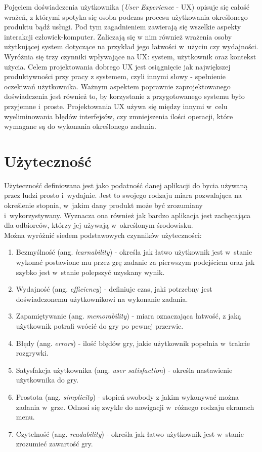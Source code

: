 \documentclass[a4paper,12pt,numbers=noenddot]{report}
\begin{document}
Pojęciem doświadczenia użytkownika (\textit{User Experience} - UX) opisuje się całość wrażeń, z którymi spotyka się osoba podczas procesu użytkowania określonego produktu bądź usługi. Pod tym zagadnieniem zawierają się wszelkie aspekty interakcji człowiek-komputer. Zaliczają się w nim również wrażenia osoby użytkującej system dotyczące na przykład jego łatwości w~użyciu czy wydajności. Wyróżnia się trzy czynniki wpływające na UX: system, użytkownik oraz kontekst użycia. \cite{online_UXDef}
Celem projektowania dobrego UX jest osiągnięcie jak największej produktywności przy pracy z systemem, czyli innymi słowy - spełnienie oczekiwań użytkownika. Ważnym aspektem poprawnie zaprojektowanego doświadczenia jest również to, by korzystanie z przygotowanego systemu było przyjemne i~proste. Projektowania UX używa się między innymi w~celu wyeliminowania błędów interfejsów, czy zmniejszenia ilości operacji, które wymagane są do wykonania określonego zadania.
\cite{art_UserExperience}

\section{Użyteczność}
Użyteczność definiowana jest jako podatność danej aplikacji do bycia używaną przez ludzi prosto i~wydajnie\cite{art_Usability}. Jest to swojego rodzaju miara pozwalająca na określenie stopnia, w~jakim dany produkt może być zrozumiany i~wykorzystywany. Wyznacza ona również jak bardzo aplikacja jest zachęcająca dla odbiorców, którzy jej używają w~określonym środowisku. \cite{art_evaluationOfMGevaluationSystem} 
\\
Można wyróżnić siedem podstawowych czynników użyteczności: \cite{art_UsabilityEvaluationSystematicReview}
\begin{enumerate}
\item Bezmyślność (ang. \textit{learnability}) - określa jak łatwo użytkownik jest w~stanie wykonać postawione mu przez grę zadanie za pierwszym podejściem oraz jak szybko jest w~stanie polepszyć uzyskany wynik.
\item Wydajność (ang. \textit{efficiency}) - definiuje czas, jaki potrzebny jest doświadczonemu użytkownikowi na wykonanie zadania.
\item Zapamiętywanie (ang. \textit{memorability}) - miara oznaczająca łatwość, z jaką użytkownik potrafi wrócić do gry po pewnej przerwie.
\item Błędy (ang. \textit{errors}) - ilość błędów gry, jakie użytkownik popełnia w~trakcie rozgrywki.
\item Satysfakcja użytkownika (ang. \textit{user satisfaction}) - określa nastawienie użytkownika do gry.
\item Prostota (ang. \textit{simplicity}) - stopień swobody z jakim wykonywać można zadania w~grze. Odnosi się zwykle do nawigacji w~różnego rodzaju ekranach menu.
\item Czytelność (ang. \textit{readability}) - określa jak łatwo użytkownik jest w~stanie zrozumieć zawartość gry.
\end{enumerate}
\end{document}
